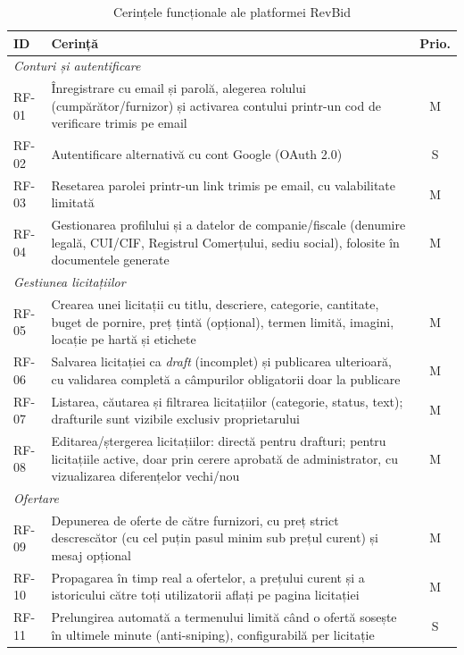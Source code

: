 \begin{table}[!ht]\small\linespread{1}
\centering
\caption{Cerințele funcționale ale platformei RevBid}
\label{tab:cerinte-functionale}
\begin{tabular}{l >{\raggedright\arraybackslash}p{11.2cm} c}
\toprule
\textbf{ID} & \textbf{Cerință} & \textbf{Prio.} \\
\midrule
\multicolumn{3}{l}{\textit{Conturi și autentificare}} \\
RF-01 & Înregistrare cu email și parolă, alegerea rolului (cumpărător/furnizor) și activarea contului printr-un cod de verificare trimis pe email & M \\
RF-02 & Autentificare alternativă cu cont Google (OAuth 2.0) & S \\
RF-03 & Resetarea parolei printr-un link trimis pe email, cu valabilitate limitată & M \\
RF-04 & Gestionarea profilului și a datelor de companie/fiscale (denumire legală, CUI/CIF, Registrul Comerțului, sediu social), folosite în documentele generate & M \\
\midrule
\multicolumn{3}{l}{\textit{Gestiunea licitațiilor}} \\
RF-05 & Crearea unei licitații cu titlu, descriere, categorie, cantitate, buget de pornire, preț țintă (opțional), termen limită, imagini, locație pe hartă și etichete & M \\
RF-06 & Salvarea licitației ca \textit{draft} (incomplet) și publicarea ulterioară, cu validarea completă a câmpurilor obligatorii doar la publicare & M \\
RF-07 & Listarea, căutarea și filtrarea licitațiilor (categorie, status, text); drafturile sunt vizibile exclusiv proprietarului & M \\
RF-08 & Editarea/ștergerea licitațiilor: directă pentru drafturi; pentru licitațiile active, doar prin cerere aprobată de administrator, cu vizualizarea diferențelor vechi/nou & M \\
\midrule
\multicolumn{3}{l}{\textit{Ofertare}} \\
RF-09 & Depunerea de oferte de către furnizori, cu preț strict descrescător (cu cel puțin pasul minim sub prețul curent) și mesaj opțional & M \\
RF-10 & Propagarea în timp real a ofertelor, a prețului curent și a istoricului către toți utilizatorii aflați pe pagina licitației & M \\
RF-11 & Prelungirea automată a termenului limită când o ofertă sosește în ultimele minute (anti-sniping), configurabilă per licitație & S \\

\end{tabular}
\end{table}
